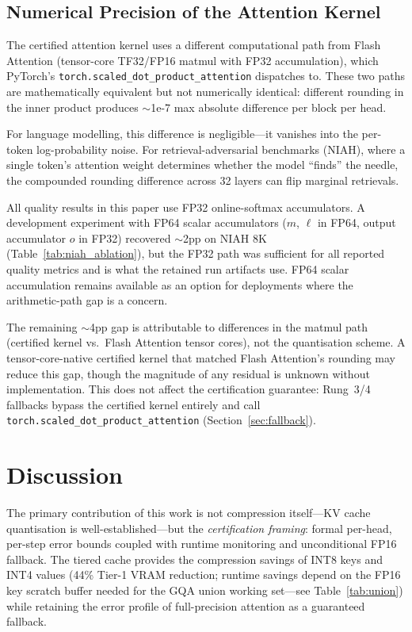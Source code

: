 \documentclass[10pt,twocolumn,a4paper]{article}
\theoremstyle{definition}
\theoremstyle{remark}
\newcommand{\torchsdpa}{\texttt{torch.scaled\_\hspace{0pt}dot\_\hspace{0pt}product\_\hspace{0pt}attention}}
\begin{document}
\subsection{Numerical Precision of the Attention Kernel}
\label{sec:numerical}

The certified attention kernel uses a different computational path from Flash Attention (tensor-core TF32/FP16 matmul with FP32 accumulation), which PyTorch's \torchsdpa{} dispatches to.  These two paths are mathematically equivalent but not numerically identical: different rounding in the inner product produces ${\sim}$1e-7 max absolute difference per block per head.

For language modelling, this difference is negligible---it vanishes into the per-token log-probability noise.  For retrieval-adversarial benchmarks (NIAH), where a single token's attention weight determines whether the model ``finds'' the needle, the compounded rounding difference across 32 layers can flip marginal retrievals.

All quality results in this paper use FP32 online-softmax accumulators.  A development experiment with FP64 scalar accumulators ($m$, $\ell$ in FP64, output accumulator $o$ in FP32) recovered $\sim$2pp on NIAH 8K (Table~\ref{tab:niah_ablation}), but the FP32 path was sufficient for all reported quality metrics and is what the retained run artifacts use.  FP64 scalar accumulation remains available as an option for deployments where the arithmetic-path gap is a concern.

The remaining $\sim$4pp gap is attributable to differences in the matmul path (certified kernel vs.\ Flash Attention tensor cores), not the quantisation scheme.  A tensor-core-native certified kernel that matched Flash Attention's rounding may reduce this gap, though the magnitude of any residual is unknown without implementation.  This does not affect the certification guarantee: Rung~3/4 fallbacks bypass the certified kernel entirely and call \torchsdpa{} (Section~\ref{sec:fallback}).


\section{Discussion}
\label{sec:discussion}

The primary contribution of this work is not compression itself---KV cache quantisation is well-established---but the \emph{certification framing}: formal per-head, per-step error bounds coupled with runtime monitoring and unconditional FP16 fallback.  The tiered cache provides the compression savings of INT8 keys and INT4 values (44\% Tier-1 VRAM reduction; runtime savings depend on the FP16 key scratch buffer needed for the GQA union working set---see Table~\ref{tab:union}) while retaining the error profile of full-precision attention as a guaranteed fallback.
\end{document}
